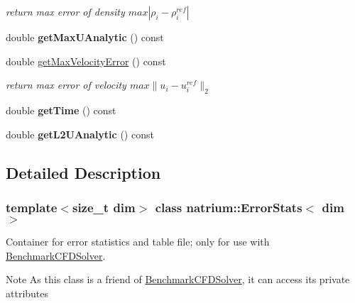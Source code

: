 \begin{DoxyCompactItemize}
\begin{DoxyCompactList}\small\item\em return max error of density $ max | \rho_{i} - \rho_{i}^{ref} | $ \item\end{DoxyCompactList}\item 
\hypertarget{classnatrium_1_1ErrorStats_a350f6b6fcc91f18006095331b0aa430c}{
double {\bfseries getMaxUAnalytic} () const }
\label{classnatrium_1_1ErrorStats_a350f6b6fcc91f18006095331b0aa430c}

\item 
\hypertarget{classnatrium_1_1ErrorStats_a48ea1bfc5db4dad6369b4b2991aa1f5c}{
double \hyperlink{classnatrium_1_1ErrorStats_a48ea1bfc5db4dad6369b4b2991aa1f5c}{getMaxVelocityError} () const }
\label{classnatrium_1_1ErrorStats_a48ea1bfc5db4dad6369b4b2991aa1f5c}

\begin{DoxyCompactList}\small\item\em return max error of velocity $ max \|u_{i} - u_{i}^{ref}\|_{2} $ \item\end{DoxyCompactList}\item 
\hypertarget{classnatrium_1_1ErrorStats_aa79b49d872935e567c94a2727af24dea}{
double {\bfseries getTime} () const }
\label{classnatrium_1_1ErrorStats_aa79b49d872935e567c94a2727af24dea}

\item 
\hypertarget{classnatrium_1_1ErrorStats_a965b8a50d1f84d8962c995808c222799}{
double {\bfseries getL2UAnalytic} () const }
\label{classnatrium_1_1ErrorStats_a965b8a50d1f84d8962c995808c222799}

\end{DoxyCompactItemize}


\subsection{Detailed Description}
\subsubsection*{template$<$size\_\-t dim$>$ class natrium::ErrorStats$<$ dim $>$}

Container for error statistics and table file; only for use with \hyperlink{classnatrium_1_1BenchmarkCFDSolver}{BenchmarkCFDSolver}. \begin{DoxyNote}{Note}
As this class is a friend of \hyperlink{classnatrium_1_1BenchmarkCFDSolver}{BenchmarkCFDSolver}, it can access its private attributes 
\end{DoxyNote}


